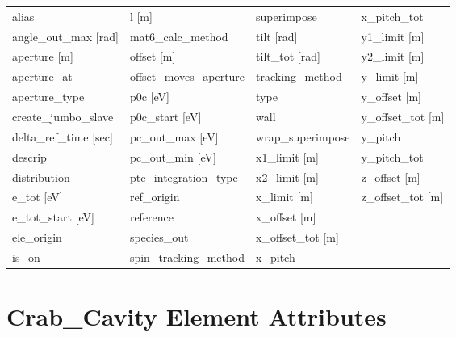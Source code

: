 \begin{tabular}{llll} \toprule
alias                            & l [m]                            & superimpose                      & x_pitch_tot                      \\
angle_out_max [rad]              & mat6_calc_method                 & tilt [rad]                       & y1_limit [m]                     \\
aperture [m]                     & offset [m]                       & tilt_tot [rad]                   & y2_limit [m]                     \\
aperture_at                      & offset_moves_aperture            & tracking_method                  & y_limit [m]                      \\
aperture_type                    & p0c [eV]                         & type                             & y_offset [m]                     \\
create_jumbo_slave               & p0c_start [eV]                   & wall                             & y_offset_tot [m]                 \\
delta_ref_time [sec]             & pc_out_max [eV]                  & wrap_superimpose                 & y_pitch                          \\
descrip                          & pc_out_min [eV]                  & x1_limit [m]                     & y_pitch_tot                      \\
distribution                     & ptc_integration_type             & x2_limit [m]                     & z_offset [m]                     \\
e_tot [eV]                       & ref_origin                       & x_limit [m]                      & z_offset_tot [m]                 \\
e_tot_start [eV]                 & reference                        & x_offset [m]                     &                                  \\
ele_origin                       & species_out                      & x_offset_tot [m]                 &                                  \\
is_on                            & spin_tracking_method             & x_pitch                          &                                  \\
 \bottomrule
 \end{tabular}
 \vfill
 
 \section{Crab_Cavity Element Attributes}
 \label{s:list.crab.cavity}
 
